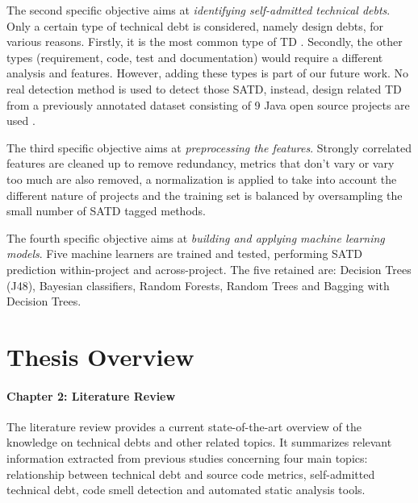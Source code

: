 The second specific objective aims at \emph{identifying self-admitted technical debts}. Only a certain type of technical debt is considered, namely design debts, for various reasons. Firstly, it is the most common type of \ac{TD} \citep{MaldonadoNLP}. Secondly, the other types (requirement, code, test and documentation) would require a different analysis and features. However, adding these types is part of our future work. No real detection method is used to detect those \ac{SATD}, instead, design related \ac{TD} from a previously annotated dataset consisting of 9 Java open source projects are used \citep{MaldonadoNLP}. \par

The third specific objective aims at \emph{preprocessing the features}. Strongly correlated features are cleaned up to remove redundancy, metrics that don't vary or vary too much are also removed, a normalization is applied to take into account the different nature of projects and the training set is balanced by oversampling the small number of \ac{SATD} tagged methods. \par

The fourth specific objective aims at \emph{building and applying machine learning models}. Five machine learners are trained and tested, performing \ac{SATD} prediction within-project and across-project. The five retained are: Decision Trees (J48), Bayesian classifiers, Random Forests, Random Trees and Bagging with Decision Trees. \par


\section{Thesis Overview}  


\paragraph{Chapter 2: Literature Review}
The literature review provides a current state-of-the-art overview of the knowledge on technical debts and other related topics. It summarizes relevant information extracted from previous studies concerning four main topics: relationship between technical debt and source code metrics, self-admitted technical debt, code smell detection and automated static analysis tools.

